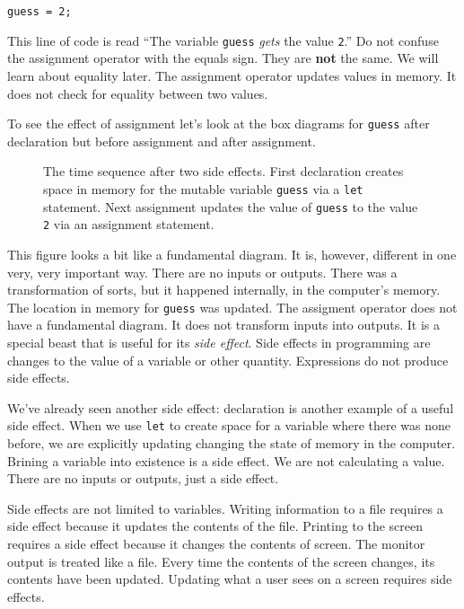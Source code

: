 \begin{lstlisting}
guess = 2;
\end{lstlisting}

This line of code is read ``The variable \texttt{guess} \emph{gets} the value
\texttt{2}.''  Do not confuse the assignment
operator with the equals sign. They are \textbf{not} the same. We will learn
about equality later. The assignment operator updates values in memory. It does
not check for equality between two values.

To see the effect of assignment let's look at the box diagrams for
\texttt{guess} after declaration but before assignment and after assignment.

\begin{figure}
  
\caption{\label{fig:intro-variable-assignment} The time sequence after two side
effects. First declaration creates space in memory for the mutable variable
\texttt{guess} via a \texttt{let} statement. Next assignment updates the value
of \texttt{guess} to the value \texttt{2} via an assignment statement.}
\end{figure}

This figure looks a bit like a fundamental diagram. It is, however, different in
one very, very important way. There are no inputs or outputs. There was a
transformation of sorts, but it happened internally, in the computer's memory.
The location in memory for \texttt{guess} was updated. The assigment operator
does not have a fundamental diagram. It does not transform inputs into outputs.
It is a special beast that is useful for its \emph{side effect}. Side effects in
programming are changes to the value of a variable or other quantity.
Expressions do not produce side effects.

We've already seen another side effect: declaration is another example of a
useful side effect. When we use \texttt{let} to create space for a variable
where there was none before, we are explicitly updating changing the state of
memory in the computer. Brining a variable into existence is a side effect. We
are not calculating a value. There are no inputs or outputs, just a side effect.

Side effects are not limited to variables. Writing information to a file
requires a side effect because it updates the contents of the file. Printing to
the screen requires a side effect because it changes the contents of screen. The
monitor output is treated like a file. Every time the contents of the screen
changes, its contents have been updated. Updating what a user sees on a screen
requires side effects.

